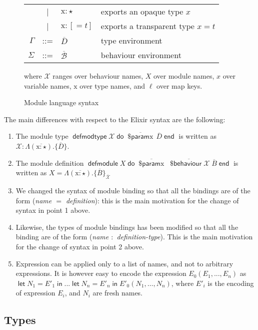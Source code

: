 \documentclass[a4paper,10pt]{article}
\DeclareMathOperator{\kwdefmt}{\textsf{defmodtype}}
\DeclareMathOperator{\kwend}{\textsf{end}}
\DeclareMathOperator{\kwdo}{\textsf{do}}
\DeclareMathOperator{\kwbvr}{\textsf{\$behaviour}}
\DeclareMathOperator{\kwlet}{\textsf{let}}
\DeclareMathOperator{\kwin}{\textsf{in}}
\DeclareMathOperator{\kwprm}{\textsf{\$param}}
\DeclareMathOperator{\kwdefm}{\textsf{defmodule}}
\newcommand{\tx}{\textrm{x}}
\newcommand{\BX}{\ensuremath{\mathcal{X}}}
\begin{document}
\begin{figure}
\begin{tabular}{r c ll}
    & | & $\tx : \star$                                 &\color{Gray} exports an opaque type $x$\\  
    & | & $\tx : [=t]$                                  &\color{Gray} exports a transparent type $x = t$  \\[3mm]
    $\Gamma$ & ::= & $\overline{D}$ &\color{Gray} type environment\\
    $\Sigma$ & ::= & $\overline{\mathcal B}$ &\color{Gray} behaviour environment\\[4mm]
  \end{tabular}

 where $\BX$ ranges over behaviour names, $X$ over module names, $x$ over variable names, $\tx$ over type names, and $\ell$ over map keys. 
  \caption{Module language syntax}\label{fig:modulelangsyntax}
\end{figure}



The main differences with respect to the Elixir syntax are the following:

\begin{enumerate}
  \item The module type $\kwdefmt \BX\kwdo \overline{\kwprm \tx}\, \overline{D} \kwend$ is written as $\BX: \Lambda(\overline{\tx:\star}).\{\overline{D}\}$.
  \item The module definition $\kwdefm X \kwdo \overline{\kwprm \tx}\; \overline{\kwbvr \mathcal{X}}\; \overline{B} \kwend$ is written as $X = \Lambda(\overline{\tx:\star}).\{\overline{B}\}_{\overline{\mathcal{X}}}$
  \item We changed the syntax of module binding so that all the bindings are of the form (\emph{name $=$ definition}): this is the main motivation for the change of syntax in point 1 above.
  \item Likewise, the types of module bindings has been modified so that all the binding are of the form (\emph{name $:$ definition-type}). This is the main motivation for the change of syntax in point 2 above.
  \item Expression can be applied only to a list of names, and not to arbitrary expressions. It is however easy to encode the expression $E_0(E_1,...,E_n)$ as $\kwlet N_1 = E'_1 \kwin ... \kwlet N_n=E'_n\kwin E'_0(N_1,\dots,N_n)$, where $E'_i$ is the encoding of expression $E_i$, and $N_i$ are fresh names.  
\end{enumerate}

\subsection{Types}
\end{document}
